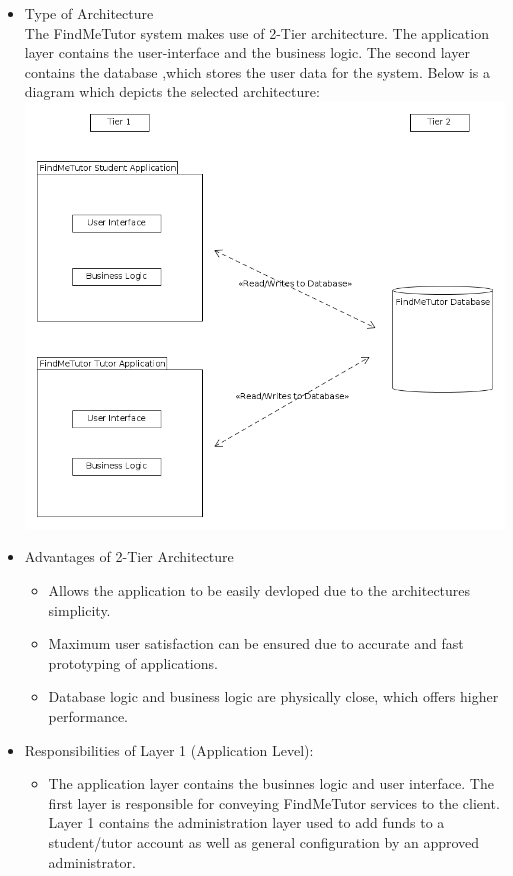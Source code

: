 \documentclass[12pt]{article}
\begin{document}
\begin{itemize}
\item Type of Architecture\\
The FindMeTutor system makes use of 2-Tier architecture. The application layer contains the user-interface and the business logic. The second layer contains the database ,which stores the user data for the system. Below is a diagram which depicts the selected architecture:\\
\includegraphics[width=140mm]{./2_Tier_Diagram.png}\\

\item Advantages of 2-Tier Architecture
\begin{itemize}
\item Allows the application to be easily devloped due to the architectures simplicity.
\item Maximum user satisfaction can be ensured due to accurate and fast prototyping of applications.
\item Database logic and business logic are physically close, which offers higher performance.\\
\end{itemize}

\item Responsibilities of Layer 1 (Application Level):
\begin{itemize}
\item The application layer contains the businnes logic and user interface. The first layer is responsible for conveying FindMeTutor services to the client. Layer 1 contains the administration layer used to add funds to a student/tutor account as well as general configuration by an approved administrator.
\end{itemize}


\end{itemize}
\end{document}
